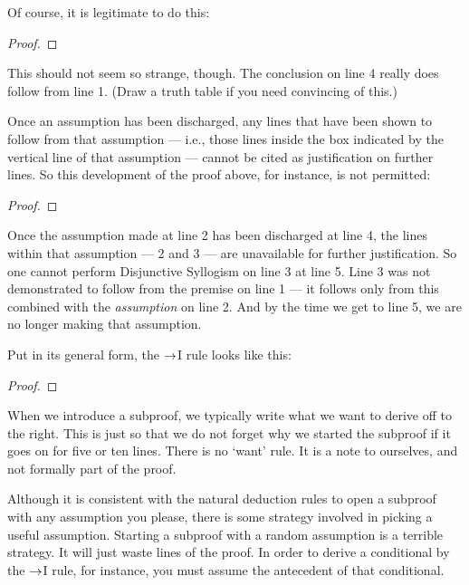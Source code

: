 Of course, it is legitimate to do this:

\begin{proof}
	\metaA{}
	\open
		\metaB{}
		 
	\close
	 
\end{proof}

This should not seem so strange, though. The conclusion on line 4 really does follow from line 1. (Draw a truth table if you need convincing of this.) 

Once an assumption has been discharged, any lines that have been shown to follow from that assumption --- i.e., those lines inside the box indicated by the vertical line of that assumption --- cannot be cited as justification on further lines. So this development of the proof above, for instance, is not permitted:

\begin{proof}
	\open
	\close
\end{proof}

Once the assumption made at line 2 has been discharged at line 4, the lines within that assumption --- 2 and 3 --- are unavailable for further justification. So one cannot perform Disjunctive Syllogism  on line 3 at line 5. Line 3 was not demonstrated to follow from the premise on line 1 --- it follows only from this combined with the \emph{assumption} on line 2. And by the time we get to line 5, we are no longer making that assumption.

Put in its general form, the $\rightarrow$I rule looks like this:

\begin{proof}
	\open
		\metaA{} 
		\metaB{}
	\close
\end{proof}

When we introduce a subproof, we typically write what we want to derive off to the right. This is just so that we do not forget why we started the subproof if it goes on for five or ten lines. There is no `want' rule. It is a note to ourselves, and not formally part of the proof.

Although it is consistent with the natural deduction rules to open a subproof with any assumption you please, there is some strategy involved in picking a useful assumption. Starting a subproof with a random assumption is a terrible strategy. It will just waste lines of the proof. In order to derive a conditional by the $\rightarrow$I rule, for instance, you must assume the antecedent of that conditional.

